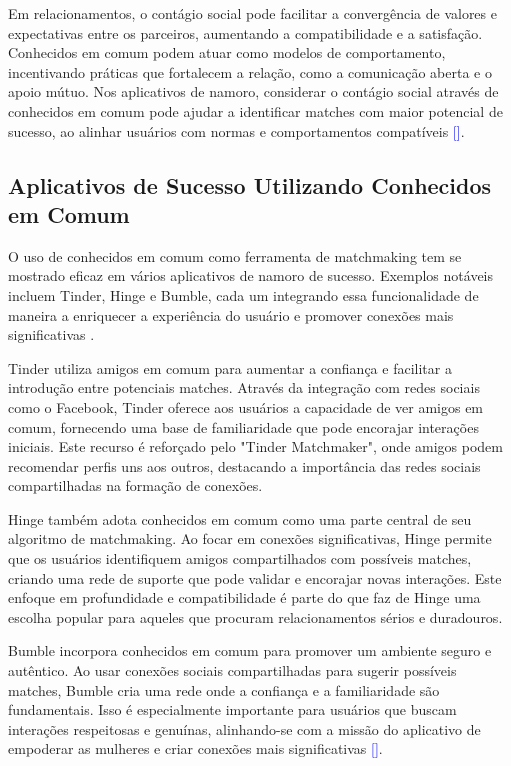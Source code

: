 Em relacionamentos, o contágio social pode facilitar a convergência de valores e expectativas entre os parceiros, aumentando a compatibilidade e a satisfação. Conhecidos em comum podem atuar como modelos de comportamento, incentivando práticas que fortalecem a relação, como a comunicação aberta e o apoio mútuo. Nos aplicativos de namoro, considerar o contágio social através de conhecidos em comum pode ajudar a identificar matches com maior potencial de sucesso, ao alinhar usuários com normas e comportamentos compatíveis \textcolor{blue}{[\cite{Christakis2007}]}.

\subsection{Aplicativos de Sucesso Utilizando Conhecidos em Comum}
O uso de conhecidos em comum como ferramenta de matchmaking tem se mostrado eficaz em vários aplicativos de namoro de sucesso. Exemplos notáveis incluem Tinder, Hinge e Bumble, cada um integrando essa funcionalidade de maneira a enriquecer a experiência do usuário e promover conexões mais significativas .

Tinder utiliza amigos em comum para aumentar a confiança e facilitar a introdução entre potenciais matches. Através da integração com redes sociais como o Facebook, Tinder oferece aos usuários a capacidade de ver amigos em comum, fornecendo uma base de familiaridade que pode encorajar interações iniciais. Este recurso é reforçado pelo "Tinder Matchmaker", onde amigos podem recomendar perfis uns aos outros, destacando a importância das redes sociais compartilhadas na formação de conexões.

Hinge também adota conhecidos em comum como uma parte central de seu algoritmo de matchmaking. Ao focar em conexões significativas, Hinge permite que os usuários identifiquem amigos compartilhados com possíveis matches, criando uma rede de suporte que pode validar e encorajar novas interações. Este enfoque em profundidade e compatibilidade é parte do que faz de Hinge uma escolha popular para aqueles que procuram relacionamentos sérios e duradouros.

Bumble incorpora conhecidos em comum para promover um ambiente seguro e autêntico. Ao usar conexões sociais compartilhadas para sugerir possíveis matches, Bumble cria uma rede onde a confiança e a familiaridade são fundamentais. Isso é especialmente importante para usuários que buscam interações respeitosas e genuínas, alinhando-se com a missão do aplicativo de empoderar as mulheres e criar conexões mais significativas \textcolor{blue}{[\cite{DatingApps2024}]}.


